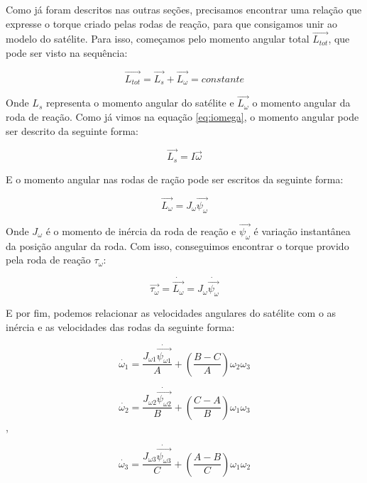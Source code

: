 Como já foram descritos nas outras seções, precisamos encontrar uma relação que expresse o torque criado pelas rodas de reação, para que consigamos unir ao modelo do satélite. Para isso, começamos pelo momento angular total $\vec{L_{tot}}$, que pode ser visto na sequência:

\begin{equation}\label{eq:ltot}
\vec{L_{tot}}=\vec{L_s}+\vec{L_{\omega}}=constante 
\end{equation}

Onde $L_s$ representa o momento angular do satélite e $\vec{L_{\omega}}$ o momento angular da roda de reação. Como já vimos na equação \ref{eq:iomega}, o momento angular pode ser descrito da seguinte forma:

\begin{equation}
\vec{L_s}=I\vec{\omega}
\end{equation}

E o momento angular nas rodas de ração pode ser escritos da seguinte forma:

\begin{equation}
\vec {L_{\omega} } =J_{\omega}\vec{\psi_{\omega}} 
\end{equation}

Onde $J_{\omega}$ é o momento de inércia da roda de reação e $\vec{\psi_{\omega}}$ é variação instantânea da posição angular da roda. Com isso, conseguimos encontrar o torque provido pela roda de reação $\tau_{\omega}$:

\begin{equation}\label{eq:torqueedo}
\vec{\tau_{\omega}}=\dot{\vec{L_{\omega}}}=J_{\omega}\dot{\vec{\psi_{\omega}}}
\end{equation}

E por fim, podemos relacionar as velocidades angulares do satélite com o as inércia e as velocidades das rodas da seguinte forma:

\begin{equation}\label{eq:modeloA}
  \dot{\omega_{1}}=\frac{J_{\omega 1}\dot{\vec{\psi_{\omega 1}}}}{A}+\left(\frac{B-C}{A}\right)\omega_{2}\omega_{3}
\end{equation}

\begin{equation}\label{eq:modeloB}
  \dot{\omega_{2}}=\frac{J_{\omega 2}\dot{\vec{\psi_{\omega 2}}}}{B}+\left(\frac{C-A}{B}\right)\omega_{1}\omega_{3}
\end{equation},

\begin{equation}\label{eq:modeloC}
  \dot{\omega_{3}}=\frac{J_{\omega 3}\dot{\vec{\psi_{\omega 3}}}}{C}+\left(\frac{A-B}{C}\right)\omega_{1}\omega_{2}
\end{equation}

